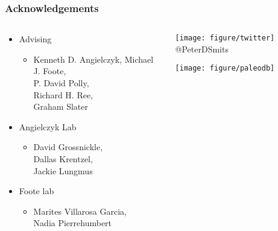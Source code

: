 \documentclass{beamer}
\begin{document}
\begin{frame}
  \frametitle{Acknowledgements}
  \begin{columns}
    \begin{column}{0.5\textwidth}
      \begin{itemize}
        \item Advising
          \begin{itemize}
            \item Kenneth D. Angielczyk, Michael J. Foote, \\P. David Polly, \\Richard H. Ree, \\Graham Slater
          \end{itemize}
        \item Angielczyk Lab
          \begin{itemize}
            \item {\small{David Grossnickle, \\Dallas Krentzel, \\Jackie Lungmus}}
          \end{itemize}
        \item Foote lab
          \begin{itemize}
            \item {\small{Marites Villarosa Garcia, \\Nadia Pierrehumbert}}
          \end{itemize}
      \end{itemize}
    \end{column}
    \begin{column}{0.5\textwidth}
      \begin{center}
        \texttt{[image: figure/twitter]} @PeterDSmits
      \end{center}
      \vspace*{0.05\textheight}
      \begin{center}
        \texttt{[image: figure/paleodb]}
      \end{center}
    \end{column}
  \end{columns}
\end{frame}
\end{document}
